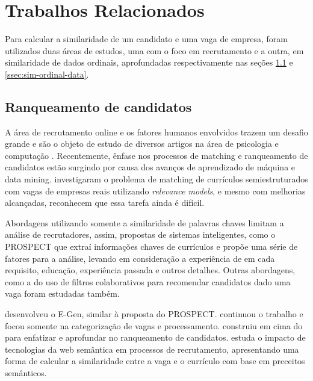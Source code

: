 \documentclass[preprint,12pt]{elsarticle}
\begin{document}
\section{Trabalhos Relacionados}
\label{sec:sample2}

Para calcular a similaridade de um candidato e uma vaga de empresa, foram utilizados duas áreas de estudos, uma com o foco em recrutamento e a outra, em similaridade de dados ordinais, aprofundadas respectivamente nas seções \ref{ssec:sim-candidate-company} e \ref{ssec:sim-ordinal-data}.


\subsection{Ranqueamento de candidatos}
\label{ssec:sim-candidate-company}

A área de recrutamento online e os fatores humanos envolvidos trazem um desafio grande e são o objeto de estudo de diversos artigos na área de psicologia \cite{Chapman2005ApplicantAT, Hunter1990IndividualDI, Steel1984ARA} e computação \cite{poch-etal-2014-ranking, Singh2010PROSPECTAS, efficient-multifaceted, improve-ranking-candidates-2009, e-gen-job-processing-2007, mochol2006practical, impact-semantic-web-2005, automatic-profiling-2008, matching-field-relevance}. Recentemente, ênfase nos processos de matching e ranqueamento de candidatos estão surgindo por causa dos avanços de aprendizado de máquina e data mining. \cite{matching-field-relevance} investigaram o problema de matching de currículos semiestruturados com vagas de empresas reais utilizando \textit{relevance models}, e mesmo com melhorias alcançadas, reconhecem que essa tarefa ainda é difícil. 

Abordagens utilizando somente a similaridade de palavras chaves limitam a análise de recrutadores, assim, propostas de sistemas inteligentes, como o PROSPECT \cite{Singh2010PROSPECTAS} que extraí informações chaves de currículos e propõe uma série de fatores para a análise, levando em consideração a experiência de em cada requisito, educação, experiência passada e outros detalhes. Outras abordagens, como a do uso de filtros colaborativos para recomendar candidatos dado uma vaga \cite{needle-haystack-recommender-systems} foram estudadas também. 

\cite{e-gen-job-processing-2007} desenvolveu o E-Gen, similar à proposta do PROSPECT. \cite{automatic-profiling-2008} continuou o trabalho e focou somente na categorização de vagas e processamento. \cite{improve-ranking-candidates-2009} construiu em cima do \cite{e-gen-job-processing-2007} para enfatizar e aprofundar no ranqueamento de candidatos. \cite{impact-semantic-web-2005} estuda o impacto de tecnologias da web semântica em processos de recrutamento, apresentando uma forma de calcular a similaridade entre a vaga e o currículo com base em preceitos semânticos.
\end{document}
